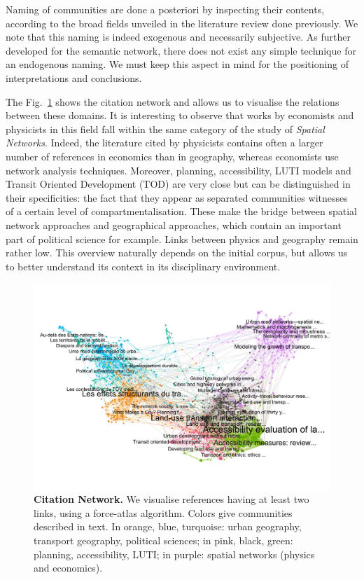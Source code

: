 \documentclass[10pt]{article}
\begin{document}
Naming of communities are done a posteriori by inspecting their contents, according to the broad fields unveiled in the literature review done previously. We note that this naming is indeed exogenous and necessarily subjective. As further developed for the semantic network, there does not exist any simple technique for an endogenous naming. We must keep this aspect in mind for the positioning of interpretations and conclusions.

The Fig.~\ref{fig:citnw} shows the citation network and allows us to visualise the relations between these domains. It is interesting to observe that works by economists and physicists in this field fall within the same category of the study of \emph{Spatial Networks}. Indeed, the literature cited by physicists contains often a larger number of references in economics than in geography, whereas economists use network analysis techniques. Moreover, planning, accessibility, LUTI models and Transit Oriented Development (TOD) are very close but can be distinguished in their specificities: the fact that they appear as separated communities witnesses of a certain level of compartmentalisation. These make the bridge between spatial network approaches and geographical approaches, which contain an important part of political science for example. Links between physics and geography remain rather low. This overview naturally depends on the initial corpus, but allows us to better understand its context in its disciplinary environment.

\begin{figure}[!ht]
\includegraphics[width=\linewidth]{2-2-2-fig-quantepistemo-citnw.jpg}
\caption{\textbf{Citation Network.} We visualise references having at least two links, using a force-atlas algorithm. Colors give communities described in text. In orange, blue, turquoise: urban geography, transport geography, political sciences; in pink, black, green: planning, accessibility, LUTI; in purple: spatial networks (physics and economics).\label{fig:citnw}}
\end{figure}
\end{document}
